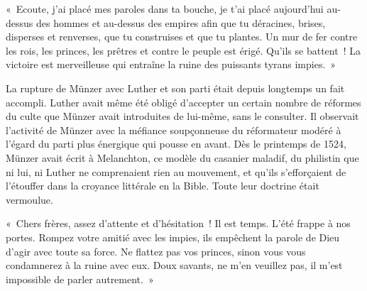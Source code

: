 \documentclass[french,twoside]{book} %
\newenvironment{quoteblock}%
  {\begin{quoting}}
  {\end{quoting}}
\newenvironment{quotebar}{%
    \def\FrameCommand{{\color{rubric!10!}\vrule width 0.5em} \hspace{0.9em}}%
    \def\OuterFrameSep{\itemsep} %
    \MakeFramed {\advance\hsize-\width \FrameRestore}
  }%
  {%
    \endMakeFramed
  }
\renewenvironment{quoteblock}%
  {%
    \savenotes
    \setstretch{0.9}
    \begin{quotebar}
  }
  {%
    \end{quotebar}
    \spewnotes
  }
\begin{document}
\begin{quoteblock}
 \noindent « Ecoute, j’ai placé mes paroles dans ta bouche, je t’ai placé aujourd’hui au-dessus des hommes et au-dessus des empires afin que tu déracines, brises, disperses et renverses, que tu construises et que tu plantes. Un mur de fer contre les rois, les princes, les prêtres et contre le peuple est érigé. Qu’ils se battent ! La victoire est merveilleuse qui entraîne la ruine des puissants tyrans impies. »
\end{quoteblock}

\noindent La rupture de Münzer avec Luther et son parti était depuis longtemps un fait accompli. Luther avait même été obligé d’accepter un certain nombre de réformes du culte que Münzer avait introduites de lui-même, sans le consulter. Il observait l’activité de Münzer avec la méfiance soupçonneuse du réformateur modéré à l’égard du parti plus énergique qui pousse en avant. Dès le printemps de 1524, Münzer avait écrit à Melanchton, ce modèle du casanier maladif, du philistin que ni lui, ni Luther ne comprenaient rien au mouvement, et qu’ils s’efforçaient de l’étouffer dans la croyance littérale en la Bible. Toute leur doctrine était vermoulue.\par

\begin{quoteblock}
 \noindent « Chers frères, assez d’attente et d’hésitation ! Il est temps. L’été frappe à nos portes. Rompez votre amitié avec les impies, ils empêchent la parole de Dieu d’agir avec toute sa force. Ne flattez pas vos princes, sinon vous vous condamnerez à la ruine avec eux. Doux savants, ne m’en veuillez pas, il m’est impossible de parler autrement. »
\end{quoteblock}
\end{document}
